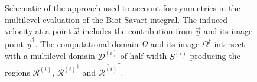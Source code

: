 \documentclass[final,1p,times]{elsarticle}
\begin{document}
\begin{figure}
    \centering
    \def\svgwidth{0.5\columnwidth}
    
    \caption{Schematic of the approach used to account for symmetries in the multilevel evaluation of the Biot-Savart integral. The induced velocity at a point $\vec{x}$ includes the contribution from $\vec{y}$ and its image point $\vec{y}^\dagger$. The computational domain $\Omega$ and its image $\Omega^\dagger$ intersect with a multilevel domain $\mathcal{D}^{(i)}$ of half-width $S^{(i)}$ producing the regions $\mathcal{R}^{(i)}$, ${\mathcal{R}^{(i)}}^\dagger$ and $\overline{\mathcal{R}^{(i)}}^\dagger$.}
    \label{a1:fig_1}
\end{figure}

  
 





\end{document}

